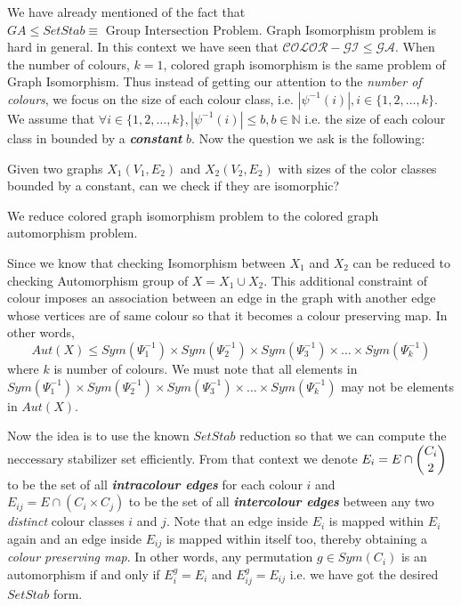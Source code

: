 We have already mentioned of the fact that $GA\leq SetStab\equiv\text{ Group Intersection Problem}$. Graph Isomorphism problem is hard in general. In this context we have seen that $\mathcal{COLOR-GI}\leq \mathcal{GA}$. When the number of colours, $k=1$, colored graph isomorphism is the same problem of Graph Isomorphism. Thus instead of getting our attention to the \emph{number of colours}, we focus on the size of each colour class, i.e. $|\psi^{-1}(i)|, i\in \{1,2,\ldots,k\}$. We assume that $\forall i\in\{1,2,\ldots,k\}, |\psi^{-1}(i)|\leq b, b\in \mathbb{N}$ i.e. the size of each colour class in bounded by a {\bf \emph{constant}} $b$. Now the question we ask is the following:
\begin{problem}
	Given two graphs $X_1(V_1,E_2)$ and $X_2(V_2,E_2)$ with sizes of the color classes bounded by a constant, can we check if they are isomorphic?
\end{problem}

We reduce colored graph isomorphism problem to the colored graph automorphism problem.

Since we know that checking Isomorphism between $X_1$ and $X_2$ can be reduced to checking Automorphism group of $X = X_1 \cup X_2$. This additional constraint of colour imposes an association between an edge in the graph with another edge whose vertices are of same colour so that it becomes a colour preserving map. In other words,
\begin{equation*}
	Aut(X)\leq Sym(\Psi^{-1}_1) \times Sym(\Psi^{-1}_2) \times Sym(\Psi^{-1}_3) \times \ldots \times Sym(\Psi^{-1}_k)
\end{equation*}
where $k$ is number of colours. We must note that all elements in $Sym(\Psi^{-1}_1) \times Sym(\Psi^{-1}_2) \times Sym(\Psi^{-1}_3) \times \ldots \times Sym(\Psi^{-1}_k)$ may not be elements in $Aut(X)$. 


Now the idea is to use the known $SetStab$ reduction so that we can compute the neccessary stabilizer set efficiently. From that context we denote $E_i = E\cap \dbinom{C_i}{2}$ to be the set of all {\bf \emph{intracolour edges}} for each colour $i$ and $E_{ij} = E\cap (C_i\times C_j)$ to be the set of all {\bf \emph{intercolour edges}} between any two \emph{distinct} colour classes $i$ and $j$. Note that an edge inside $E_i$ is mapped within $E_i$ again and an edge inside $E_{ij}$ is mapped within itself too, thereby obtaining a \emph{colour preserving map}. In other words, any permutation $g \in Sym(C_i)$ is an automorphism if and only if $E_i^g = E_i$ and $E_{ij}^g = E_{ij}$ i.e. we have got the desired $SetStab$ form.


